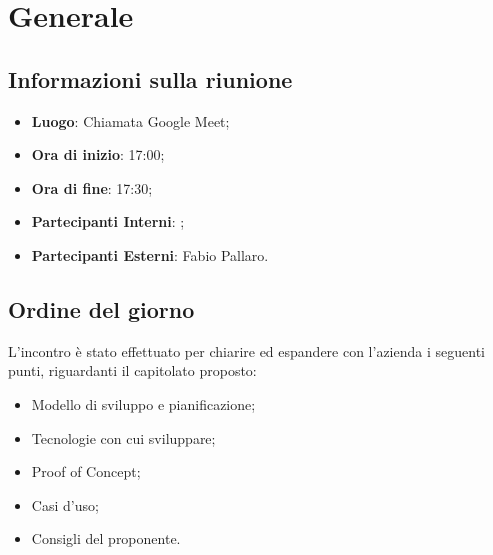 \section{Generale}

\vspace{10pt}


\subsection{Informazioni sulla riunione}
\begin{itemize}
	\item \textbf{Luogo}: Chiamata Google Meet;
	\item \textbf{Ora di inizio}: 17:00;
	\item \textbf{Ora di fine}: 17:30;
	\item \textbf{Partecipanti Interni}: \team;
	\item \textbf{Partecipanti Esterni}: Fabio Pallaro.
	
\end{itemize}

\vspace{5pt}

\subsection{Ordine del giorno}
L'incontro è stato effettuato per chiarire ed espandere con l'azienda i seguenti punti, riguardanti il capitolato proposto:
\begin{itemize}
	\item Modello di sviluppo e pianificazione;
	\item Tecnologie con cui sviluppare;
	\item Proof of Concept;
	\item Casi d'uso;
	\item Consigli del proponente.
\end{itemize}
